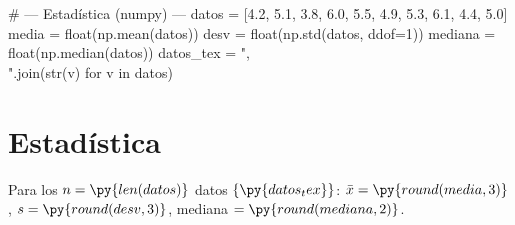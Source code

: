 \documentclass[11pt]{article}
\begin{document}
# --- Estadística (numpy) ---
datos = [4.2, 5.1, 3.8, 6.0, 5.5, 4.9, 5.3, 6.1, 4.4, 5.0]
media = float(np.mean(datos))
desv = float(np.std(datos, ddof=1))
mediana = float(np.median(datos))
datos_tex = ",\\ ".join(str(v) for v in datos)

\section{Estadística}
Para los $n = \py{len(datos)}$ datos $\{\py{datos_tex}\}$:
$\bar{x} = \py{round(media,3)}$, $s = \py{round(desv,3)}$,
mediana $= \py{round(mediana,2)}$.
\end{document}
